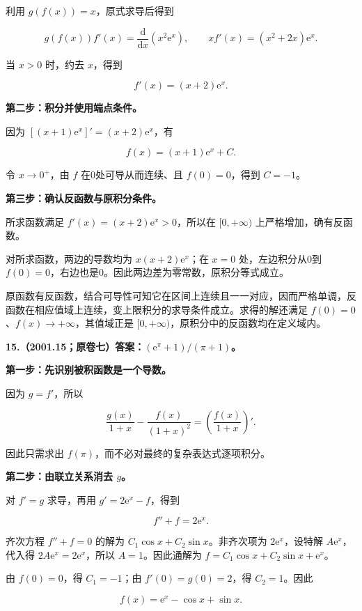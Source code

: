 \documentclass[UTF8,11pt,fontset=windows]{ctexart}
\begin{document}
利用 $g(f(x))=x$，原式求导后得到

$$
g(f(x))f'(x)=\frac{\mathrm d}{\mathrm dx}(x^2\mathrm e^x),
\qquad x f'(x)=(x^2+2x)\mathrm e^x.
$$

当 $x>0$ 时，约去 $x$，得到

$$
f'(x)=(x+2)\mathrm e^x.
$$

\textbf{第二步：积分并使用端点条件。}

因为 $[(x+1)\mathrm e^x]'=(x+2)\mathrm e^x$，有

$$
f(x)=(x+1)\mathrm e^x+C.
$$

令 $x\to0^+$，由 $f$ 在0处可导从而连续、且 $f(0)=0$，得到 $C=-1$。

\textbf{第三步：确认反函数与原积分条件。}

所求函数满足 $f'(x)=(x+2)\mathrm e^x>0$，所以在 $[0,+\infty)$ 上严格增加，确有反函数。

对所求函数，两边的导数均为 $x(x+2)\mathrm e^x$；在 $x=0$ 处，左边积分从0到 $f(0)=0$，右边也是0。因此两边差为零常数，原积分等式成立。

原函数有反函数，结合可导性可知它在区间上连续且一一对应，因而严格单调，反函数在相应值域上连续，变上限积分的求导条件成立。求得的解还满足 $f(0)=0$、$f(x)\to+\infty$，其值域正是 $[0,+\infty)$，原积分中的反函数均在定义域内。

\clearpage

\textbf{15.（2001.15；原卷七）答案：$(\mathrm e^\pi+1)/(\pi+1)$。}

\textbf{第一步：先识别被积函数是一个导数。}

因为 $g=f'$，所以

$$
\frac{g(x)}{1+x}-\frac{f(x)}{(1+x)^2}
=\left(\frac{f(x)}{1+x}\right)'.
$$

因此只需求出 $f(\pi)$，而不必对最终的复杂表达式逐项积分。

\textbf{第二步：由联立关系消去 $g$。}

对 $f'=g$ 求导，再用 $g'=2\mathrm e^x-f$，得到

$$
f''+f=2\mathrm e^x.
$$

齐次方程 $f''+f=0$ 的解为 $C_1\cos x+C_2\sin x$。非齐次项为 $2\mathrm e^x$，设特解 $A\mathrm e^x$，代入得 $2A\mathrm e^x=2\mathrm e^x$，所以 $A=1$。因此通解为 $f=C_1\cos x+C_2\sin x+\mathrm e^x$。

由 $f(0)=0$，得 $C_1=-1$；由 $f'(0)=g(0)=2$，得 $C_2=1$。因此

$$
f(x)=\mathrm e^x-\cos x+\sin x.
$$
\end{document}
